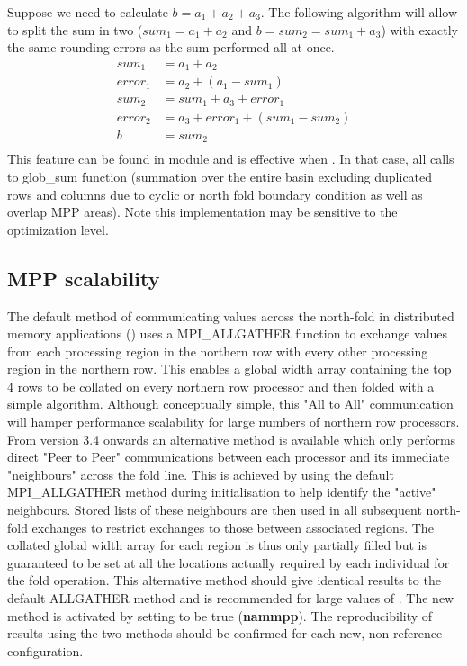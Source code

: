 \documentclass[NEMO_book]{subfiles}
\begin{document}
Suppose we need to calculate $b = a_1 + a_2 + a_3$. The following algorithm 
will allow to split the sum in two ($sum_1 = a_{1} + a_{2}$ and $b = sum_2 = sum_1 + a_3$) 
with exactly the same rounding errors as the sum performed all at once.
\begin{align*}
	sum_1 \ \  &= a_1 + a_2 \\
	error_1     &= a_2 + ( a_1 - sum_1 ) \\
	sum_2 \ \  &= sum_1 + a_3 + error_1 \\
	error_2     &= a_3 + error_1 + ( sum_1 - sum_2 ) \\
	b \qquad \ &= sum_2 \\
\end{align*}
This feature can be found in  module and is effective when .
In that case, all calls to glob\_sum function (summation over the entire basin excluding 
duplicated rows and columns due to cyclic or north fold boundary condition as well as 
overlap MPP areas). 
Note this implementation may be sensitive to the optimization level. 

\subsection{MPP scalability}
\label{MISC_mppsca}

The default method of communicating values across the north-fold in distributed memory applications
() uses a \textsc{MPI\_ALLGATHER} function to exchange values from each processing
region in the northern row with every other processing region in the northern row. This enables a
global width array containing the top 4 rows to be collated on every northern row processor and then
folded with a simple algorithm. Although conceptually simple, this "All to All" communication will
hamper performance scalability for large numbers of northern row processors. From version 3.4
onwards an alternative method is available which only performs direct "Peer to Peer" communications
between each processor and its immediate "neighbours" across the fold line. This is achieved by
using the default \textsc{MPI\_ALLGATHER} method during initialisation to help identify the "active"
neighbours. Stored lists of these neighbours are then used in all subsequent north-fold exchanges to
restrict exchanges to those between associated regions. The collated global width array for each
region is thus only partially filled but is guaranteed to be set at all the locations actually
required by each individual for the fold operation. This alternative method should give identical
results to the default \textsc{ALLGATHER} method and is recommended for large values of .
The new method is activated by setting  to be true ({\bf nammpp}). The
reproducibility of results using the two methods should be confirmed for each new, non-reference
configuration.
\end{document}
